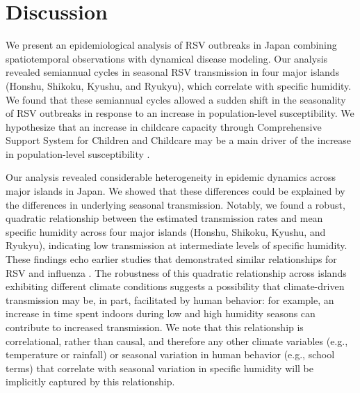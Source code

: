 \documentclass[12pt]{article}
\begin{document}
\section*{Discussion}

We present an epidemiological analysis of RSV outbreaks in Japan combining spatiotemporal observations with dynamical disease modeling.
Our analysis revealed semiannual cycles in seasonal RSV transmission in four major islands (Honshu, Shikoku, Kyushu, and Ryukyu), which correlate with specific humidity.
We found that these semiannual cycles allowed a sudden shift in the seasonality of RSV outbreaks in response to an increase in population-level susceptibility.
We hypothesize that an increase in childcare capacity through Comprehensive Support System for Children and Childcare may be a main driver of the increase in population-level susceptibility \citep{dehaan2024age}.

Our analysis revealed considerable heterogeneity in epidemic dynamics across major islands in Japan.
We showed that these differences could be explained by the differences in underlying seasonal transmission.
Notably, we found a robust, quadratic relationship between the estimated transmission rates and mean specific humidity across four major islands (Honshu, Shikoku, Kyushu, and Ryukyu), indicating low transmission at intermediate levels of specific humidity.
These findings echo earlier studies that demonstrated similar relationships for RSV \citep{baker2019epidemic} and influenza \citep{lowen2007influenza,shaman2009absolute,shaman2010absolute,tamerius2013environmental,lowen2014roles}.
The robustness of this quadratic relationship across islands exhibiting different climate conditions suggests a possibility that climate-driven transmission may be, in part, facilitated by human behavior: for example, an increase in time spent indoors during low and high humidity seasons can contribute to increased transmission.
We note that this relationship is correlational, rather than causal, and therefore any other climate variables (e.g., temperature or rainfall) or seasonal variation in human behavior (e.g., school terms) that correlate with seasonal variation in specific humidity will be implicitly captured by this relationship.
\end{document}
